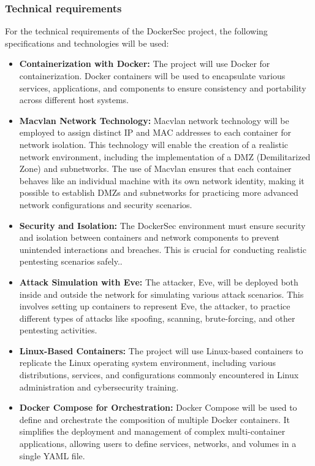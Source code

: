 \documentclass[a4paper,11pt,singlespacing]{article}
\begin{document}
\subsubsection{Technical requirements}
For the technical requirements of the DockerSec project, the following specifications and technologies will be used:
\begin{itemize}
    \item \textbf{Containerization with Docker:} The project will use Docker for containerization. Docker containers will be used to encapsulate various services, applications, and components to ensure consistency and portability across different host systems.

    \item \textbf{Macvlan Network Technology:}  Macvlan network technology will be employed to assign distinct IP and MAC addresses to each container for network isolation. This technology will enable the creation of a realistic network environment, including the implementation of a DMZ (Demilitarized Zone) and subnetworks. The use of Macvlan ensures that each container behaves like an individual machine with its own network identity, making it possible to establish DMZs and subnetworks for practicing more advanced network configurations and security scenarios.
    
    \item \textbf{Security and Isolation:} The DockerSec environment must ensure security and isolation between containers and network components to prevent unintended interactions and breaches. This is crucial for conducting realistic pentesting scenarios safely..
   
    \item \textbf{Attack Simulation with Eve:} The attacker, Eve, will be deployed both inside and outside the network for simulating various attack scenarios. This involves setting up containers to represent Eve, the attacker, to practice different types of attacks like spoofing, scanning, brute-forcing, and other pentesting activities.

    \item \textbf{Linux-Based Containers:} The project will use Linux-based containers to replicate the Linux operating system environment, including various distributions, services, and configurations commonly encountered in Linux administration and cybersecurity training.

    \item \textbf{Docker Compose for Orchestration:} Docker Compose will be used to define and orchestrate the composition of multiple Docker containers. It simplifies the deployment and management of complex multi-container applications, allowing users to define services, networks, and volumes in a single YAML file.


\end{itemize}
\end{document}
